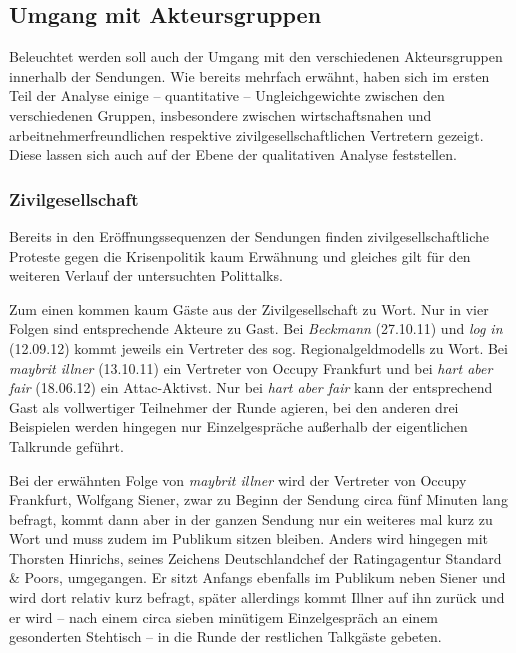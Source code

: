 \subsection{Umgang mit Akteursgruppen}\label{chap:akteursgruppen}

Beleuchtet werden soll auch der Umgang mit den verschiedenen Akteursgruppen innerhalb der Sendungen. Wie bereits mehrfach erwähnt, haben sich im ersten Teil der Analyse einige – quantitative – Ungleichgewichte zwischen den verschiedenen Gruppen, insbesondere zwischen wirtschaftsnahen und arbeitnehmerfreundlichen respektive zivilgesellschaftlichen Vertretern gezeigt. Diese lassen sich auch auf der Ebene der qualitativen Analyse feststellen.

\subsubsection{Zivilgesellschaft}

Bereits in den Eröffnungssequenzen der Sendungen finden zivilgesellschaftliche Proteste gegen die Krisenpolitik kaum Erwähnung und gleiches gilt für den weiteren Verlauf der untersuchten Polittalks.

Zum einen kommen kaum Gäste aus der Zivilgesellschaft zu Wort. Nur in vier Folgen sind entsprechende Akteure zu Gast. Bei \textit{Beckmann} (27.10.11) und \textit{log in} (12.09.12) kommt jeweils ein Vertreter des sog. Regionalgeldmodells zu Wort. Bei \textit{maybrit illner} (13.10.11) ein Vertreter von Occupy Frankfurt und bei \textit{hart aber fair} (18.06.12) ein Attac-Aktivst. Nur bei \textit{hart aber fair} kann der entsprechend Gast als vollwertiger Teilnehmer der Runde agieren, bei den anderen drei Beispielen werden hingegen nur Einzelgespräche außerhalb der eigentlichen Talkrunde geführt.

Bei der erwähnten Folge von \textit{maybrit illner} wird der Vertreter von Occupy Frankfurt, Wolfgang Siener, zwar zu Beginn der Sendung circa fünf Minuten lang befragt, kommt dann aber in der ganzen Sendung nur ein weiteres mal kurz zu Wort und muss zudem im Publikum sitzen bleiben. Anders wird hingegen mit Thorsten Hinrichs, seines Zeichens Deutschlandchef der Ratingagentur Standard \& Poors, umgegangen. Er sitzt Anfangs ebenfalls im Publikum neben Siener und wird dort relativ kurz befragt, später allerdings kommt Illner auf ihn zurück und er wird – nach einem circa sieben minütigem Einzelgespräch an einem gesonderten Stehtisch – in die Runde der restlichen Talkgäste gebeten.


